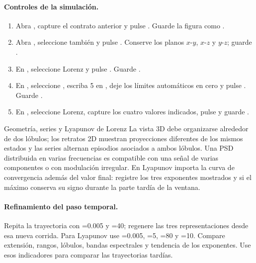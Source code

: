 \paragraph{Controles de la simulación.}
\begin{enumerate}
  \item Abra , capture el contrato anterior y pulse
  . Guarde la figura como
  .
  \item Abra , seleccione también
   y pulse . Conserve los
  planos \(x\)-\(y\), \(x\)-\(z\) y \(y\)-\(z\); guarde
  .
  \item En , seleccione Lorenz y pulse
  . Guarde
  .
  \item En , seleccione
  , escriba 5 en
  , deje los límites automáticos en cero y
  pulse . Guarde
  .
  \item En , seleccione Lorenz, capture los cuatro valores
  indicados, pulse  y guarde
  .
\end{enumerate}

\begin{cajaverde}{Geometría, series y Lyapunov de Lorenz}
La vista 3D debe organizarse alrededor de dos lóbulos; los retratos 2D muestran
proyecciones diferentes de los mismos estados y las series alternan episodios
asociados a ambos lóbulos. Una PSD distribuida en varias frecuencias es
compatible con una señal de varias componentes o con modulación irregular. En Lyapunov importa la curva
de convergencia además del valor final: registre los tres exponentes mostrados
y si el máximo conserva su signo durante la parte tardía de la ventana.
\end{cajaverde}


\paragraph{Refinamiento del paso temporal.}
Repita la trayectoria con =0.005 y =40;
regenere las tres representaciones desde esa nueva corrida. Para Lyapunov use
=0.005, =5,
=80 y =10. Compare extensión,
rangos, lóbulos, bandas espectrales y tendencia de los exponentes. Use esos
indicadores para comparar las trayectorias tardías.

